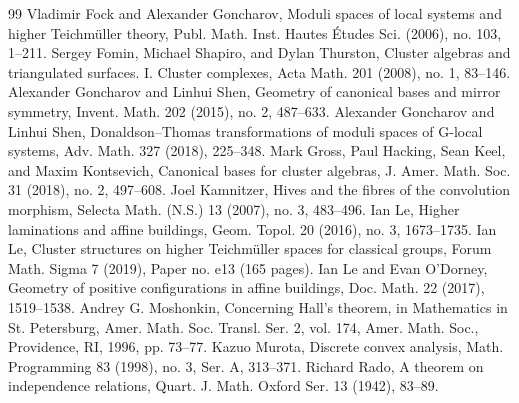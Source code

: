 \documentclass[10pt]{amsart}
\theoremstyle{definition}
\begin{document}
\begin{thebibliography}{99}
 Vladimir Fock and Alexander Goncharov, Moduli spaces of local systems and higher Teichmüller theory, Publ. Math. Inst. Hautes Études Sci. (2006), no. 103, 1--211.
 Sergey Fomin, Michael Shapiro, and Dylan Thurston, Cluster algebras and triangulated surfaces. I. Cluster complexes, Acta Math. 201 (2008), no. 1, 83--146.
 Alexander Goncharov and Linhui Shen, Geometry of canonical bases and mirror symmetry, Invent. Math. 202 (2015), no. 2, 487--633.
 Alexander Goncharov and Linhui Shen, Donaldson--Thomas transformations of moduli spaces of G-local systems, Adv. Math. 327 (2018), 225--348.
 Mark Gross, Paul Hacking, Sean Keel, and Maxim Kontsevich, Canonical bases for cluster algebras, J. Amer. Math. Soc. 31 (2018), no. 2, 497--608.
 Joel Kamnitzer, Hives and the fibres of the convolution morphism, Selecta Math. (N.S.) 13 (2007), no. 3, 483--496.
 Ian Le, Higher laminations and affine buildings, Geom. Topol. 20 (2016), no. 3, 1673--1735.
 Ian Le, Cluster structures on higher Teichmüller spaces for classical groups, Forum Math. Sigma 7 (2019), Paper no. e13 (165 pages).
 Ian Le and Evan O'Dorney, Geometry of positive configurations in affine buildings, Doc. Math. 22 (2017), 1519--1538.
 Andrey G. Moshonkin, Concerning Hall's theorem, in Mathematics in St. Petersburg, Amer. Math. Soc. Transl. Ser. 2, vol. 174, Amer. Math. Soc., Providence, RI, 1996, pp. 73--77.
 Kazuo Murota, Discrete convex analysis, Math. Programming 83 (1998), no. 3, Ser. A, 313--371.
 Richard Rado, A theorem on independence relations, Quart. J. Math. Oxford Ser. 13 (1942), 83--89.
\end{thebibliography}
\end{document}
